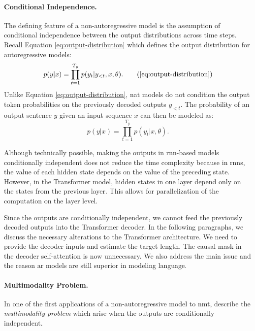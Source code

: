 \paragraph{Conditional Independence.} The defining feature of a
non-autoregressive model is the assumption of conditional independence between
the output distributions across time steps. Recall Equation
\ref{eq:output-distribution} which defines the output distribution for
autoregressive models:
%
\begin{equation*}
  p(y|x) = \prod_{t=1}^{T_y}p(y_t|y_{<t},x,\theta).
  \tag{\ref{eq:output-distribution}}
\end{equation*}
%
Unlike Equation \ref{eq:output-distribution}, \Ac{nat} models do not condition
the output token probabilities on the previously decoded outputs $y_{<t}$.  The
probability of an output sentence $y$ given an input sequence $x$ can then be
modeled as:
%
\begin{equation}
  p(y|x) = \prod_{t=1}^{T_y}p(y_t|x,\theta).
  \label{eq:nat-output-distribution}
\end{equation}

Although technically possible, making the outputs in \acs{rnn}-based models
conditionally independent does not reduce the time complexity because in
\acsp{rnn}, the value of each hidden state depends on the value of the
preceding state. However, in the Transformer model, hidden states in one layer
depend only on the states from the previous layer. This allows for
parallelization of the computation on the layer level.

Since the outputs are conditionally independent, we cannot feed the previously
decoded outputs into the Transformer decoder. In the following paragraphs, we
discuss the necessary alterations to the Transformer architecture. We need to
provide the decoder inputs and estimate the target length. The causal mask in
the decoder self-attention is now unnecessary. We also address the main issue
and the reason \ac{ar} models are still superior in modeling language.

\paragraph{Multimodality Problem.} In one of the first applications of a
non-autoregressive model to \ac{nmt}, \citet{gu2017nonautoregressive} describe
the \emph{multimodality problem} which arise when the outputs are conditionally
independent.

